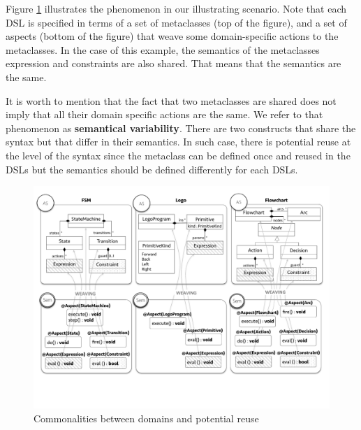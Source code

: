 Figure \ref{fig:domains} illustrates the phenomenon in our illustrating scenario. Note that each DSL is specified in terms of a set of metaclasses (top of the figure), and a set of aspects (bottom of the figure) that weave some domain-specific actions to the metaclasses. In the case of this example, the semantics of the metaclasses expression and constraints are also shared. That means that the semantics are the same. 

It is worth to mention that the fact that two metaclasses are shared does not imply that all their domain specific actions are the same. We refer to that phenomenon as \textbf{semantical variability}. There are two constructs that share the syntax but that differ in their semantics. In such case, there is potential reuse at the level of the syntax since the metaclass can be defined once and reused in the DSLs but the semantics should be defined differently for each DSLs. 

\begin{figure}
\centering
\includegraphics[width=1\linewidth]{images/domains-fig.pdf}
\caption{Commonalities between domains and potential reuse}
\label{fig:domains}
\end{figure}




